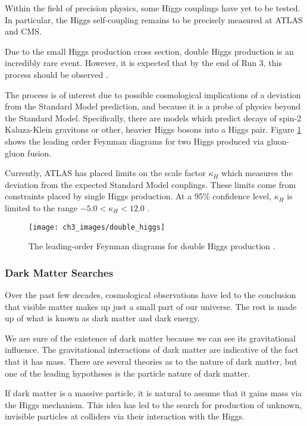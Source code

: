 \documentclass[10pt,a4paper]{book}
\begin{document}
Within the field of precision physics, some Higgs couplings have yet to be tested. In particular, the Higgs self-coupling remains to be precisely measured at ATLAS and CMS. 

Due to the small Higgs production cross section, double Higgs production is an incredibly rare event. However, it is expected that by the end of Run 3, this process should be observed \cite{Chen:2017khz}. 

The process is of interest due to possible cosmological implications of a deviation from the Standard Model prediction, and because it is a probe of physics beyond the Standard Model. Specifically, there are models which predict 
decays of spin-2 Kaluza-Klein gravitons or other, heavier Higgs bosons into a Higgs pair. Figure \ref{double Higgs} shows the leading order Feynman diagrams for two Higgs produced via gluon-gluon fusion.
 
Currently, ATLAS has placed limits on the scale factor $\kappa_H$ which measures the deviation from the expected Standard Model couplings. These limits come from constraints placed by single Higgs production. At a 95\% confidence level, $\kappa_H$ is limited to the range $-5.0 < \kappa_H < 12.0$ \cite{ATLAS:2019qdc}.

\begin{figure}
\centering
\texttt{[image: ch3\_images/double\_higgs]}
\label{double Higgs}
\caption{The leading-order Feynman diagrams for double Higgs production \cite{ATLAS:2019qdc}.}
\end{figure}

\subsubsection{Dark Matter Searches}

Over the past few decades, cosmological observations have led to the conclusion that visible matter makes up just a small part of our universe. The rest is made up of what is known as dark matter and dark energy.

We are sure of the existence of dark matter because we can see its gravitational influence. The gravitational interactions of dark matter are indicative of the fact that it has mass. There are several theories as to the nature of dark matter, but one of the leading hypotheses is the particle nature of dark matter.

If dark matter is a massive particle, it is natural to assume that it gains mass via the Higgs mechanism. This idea has led to the search for production of unknown, invisible particles at colliders via their interaction with the Higgs. 
\end{document}
